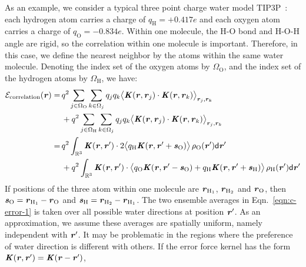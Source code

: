 \documentclass[aps,pre,preprint,unsortedaddress]{revtex4}
\renewcommand{\v}[1]{\textbf{\textit{#1}}}
\renewcommand{\d}[1]{\textsf{#1}}
\begin{document}
As an example, we consider a typical three point charge water model
TIP3P~\cite{jorgensen1983comparison}: each hydrogen atom carries a
charge of $q_{\textrm{H}} = +0.417e$ and each oxygen atom carries a
charge of $q_{\textrm{O}} = -0.834e$. Within one molecule, the H-O
bond and H-O-H angle are rigid, so the correlation within one molecule
is important.  Therefore, in this case, we define the nearest neighbor by the
atoms within the same water molecule.  Denoting the index set of the oxygen
atoms by $\Omega_{\textrm{O}}$, and the index set of the hydrogen
atoms by $\Omega_{\textrm{H}}$, we have:
\begin{align}\nonumber
  \mathcal E_{\textrm{correlation}}(\v r)
  = &\,
  q^2\sum_{j\in\Omega_{\textrm{O}}}\sum_{k\in\Omega_j}q_jq_k
  \big\langle
  \v K(\v r , \v r_j)\cdot\v K(\v r , \v r_k)
  \big\rangle_{\v r_j,\v r_k} \\ \nonumber
  &\,+ 
  q^2\sum_{j\in\Omega_{\textrm{H}}}\sum_{k\in\Omega_j}q_jq_k
  \big\langle
  \v K(\v r , \v r_j)\cdot\v K(\v r , \v r_k)
  \big\rangle_{\v r_j,\v r_k} \\\nonumber
  = &\,
  q^2
  \int_{\mathbb R^3}
  \v K(\v r , \v r')\cdot
  2\big\langle
  q_{\textrm{H}}\v K(\v r , \v r' + \v s_{\textrm{O}})
  \big\rangle\,
  \rho_{\textrm{O}}(\v r')
  \d d\v r' \\\label{eqn:c-error-1}
  & \,+
  q^2
  \int_{\mathbb R^3}
  \v K(\v r , \v r')\cdot
  \big\langle
  q_{\textrm{O}}\v K(\v r , \v r' - \v s_{\textrm{O}})+
  q_{\textrm{H}}\v K(\v r , \v r' + \v s_{\textrm{H}})
  \big\rangle\,\rho_{\textrm{H}}(\v r')
  \d d\v r'
\end{align}
If positions of the three atom within one molecule are
$\v r_{\textrm{H}_1}$, $\v r_{\textrm{H}_2}$ and $\v r_{\textrm{O}}$, then
$\v s_{\textrm{O}} = \v r_{\textrm{H}_1} - \v r_{\textrm{O}}$ and
$\v s_{\textrm{H}} = \v r_{\textrm{H}_2} - \v r_{\textrm{H}_1}$.
The two ensemble averages in Eqn.~\eqref{eqn:c-error-1}
is taken over all possible water directions 
at position $\v r'$. As an approximation, we
assume these averages are  spatially uniform, namely independent with $\v r'$.
It may be  problematic
in the regions where the preference of water  direction is different
with others.
If the error force kernel
has the form $\v K(\v r , \v r') = \v K(\v r - \v r')$, 
\end{document}

